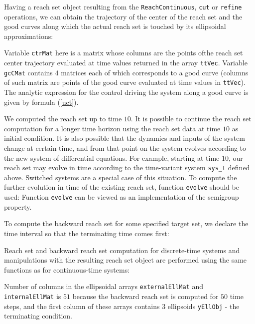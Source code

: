 Having a reach set object resulting from the {\tt ReachContinuous}, {\tt cut} or
{\tt refine} operations, we can obtain the trajectory of the center
of the reach set and the good curves along which the actual reach set
is touched by its ellipsoidal approximations:

Variable {\tt ctrMat} here is a matrix whose columns are the points ofthe
reach set center trajectory evaluated at time values returned in the
array {\tt ttVec}. Variable {\tt gcCMat} contains $4$ matrices each of which
corresponds to a good curve (columns of such matrix are points of the
good curve evaluated at time values in {\tt ttVec}).
The analytic expression for the control driving the system along a good
curve is given by formula (\ref{uct}).

We computed the reach set up to time $10$. It is possible to continue
the reach set computation for a longer time horizon using the reach set
data at time $10$ as initial condition.
It is also possible that the dynamics and inputs of the system change at
certain time, and from that point on the system evolves according to the new
system of differential equations. For example, starting at time $10$, our
reach set may evolve in time according to the time-variant system {\tt sys\_t}
defined above. Switched systems are a special case of this situation.
To compute the further evolution in time of the existing reach set,
function {\tt evolve} should be used:
Function {\tt evolve} can be viewed as an implementation of the semigroup
property.

To compute the backward reach set for some specified target set,
we declare the time interval so that the terminating time comes first:

Reach set and backward reach set computation for discrete-time systems and
manipulations with the resulting reach set object are performed using
the same functions as for continuous-time systems:

Number of columns in the ellipsoidal arrays {\tt externalEllMat} and {\tt internalEllMat} is $51$
because the backward reach set is computed for $50$ time steps, and the first
column of these arrays contains $3$ ellipsoids {\tt yEllObj} - the terminating
condition.

